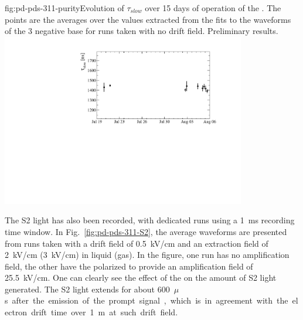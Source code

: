 \begin{dunefigure}{fig:pd-pds-311-purity}{Evolution of $\tau_{slow}$ over \num{15} days of operation of the . The points are the averages over the values extracted from the fits to the waveforms of the \num{3} negative base  for runs taken with no drift field. Preliminary results.}
\includegraphics[width=0.8\textwidth]{graphics/dppd_311_purity.pdf}
\end{dunefigure}

The S2 light has also been recorded, with dedicated runs using a \SI{1}{ms} recording time window.
In Fig.~\ref{fig:pd-pds-311-S2}, the average waveforms are presented from runs taken with a drift field of \SI{0.5}{kV/cm} and an extraction field of \SI{2}{kV/cm} (\SI{3}{kV/cm}) in liquid (gas). In the figure, one run has no amplification field, the other have the  polarized to provide an amplification field of \SI{25.5}{kV/cm}. 
One can clearly see the effect of the  on the amount of S2 light generated. 
The S2 light extends for about \SI{600}{$\mu$s} after the emission of the prompt signal, which is in agreement with the electron drift time over \SI{1}{m} at such drift field.

